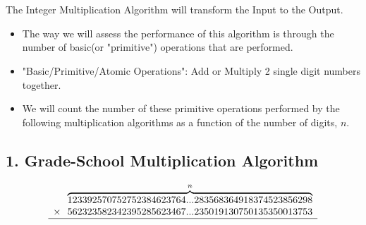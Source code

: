 \documentclass{article}
\begin{document}
\begin{center}
\end{center}

\

\

The Integer Multiplication Algorithm will transform the Input to the Output.

\begin{itemize}
    \item The way we will assess the performance of this algorithm is through the number of basic(or "primitive") operations that are performed.
    \item "Basic/Primitive/Atomic Operations": Add or Multiply 2 single digit numbers together.
    \item We will count the number of these primitive operations performed by the following multiplication algorithms as a function of the number of digits, $n$.
\end{itemize}

\subsection*{1. Grade-School Multiplication Algorithm}

\[
\begin{array}{r} %
  \overbrace{123392570752752384623764...283568364918374523856298}^{\text{$n$}} \\ %
  \times \ \ 562323582342395285623467...235019130750135350013753 \\ %
  \hline %
\end{array}
\]
\end{document}
